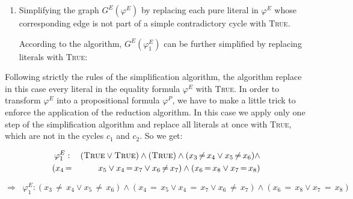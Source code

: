 \documentclass[11pt,a4paper]{uebung}
\begin{document}
{\begin{enumerate}
%

The equality graph has two contradictory cycles, $%
c_{1}=(x_{6},x_{8},x_{7},x_{6})$ and $%
c_{2}=(x_{4},x_{5},x_{6},x_{8},x_{7},x_{4})$.

\item Simplifying the graph $G^{E}(\varphi ^{E})$ by replacing each pure
literal in $\varphi ^{E}$ whose corresponding edge is not part of a simple
contradictory cycle with \textsc{True}.

According to the algorithm, $G^{E}(\varphi _{1}^{E})$ can be further
simplified by replacing literals with \textsc{True}:
\bigskip
\end{enumerate}

Following strictly the rules of the simplification algorithm, the algorithm
replace in this case every literal in the equality formula $\varphi ^{E}$
with \textsc{True}. In order to transform $\varphi ^{E}$ into a
propositional formula $\varphi ^{P}$, we have to make a little trick to
enforce the application of the reduction algorithm. In this case we apply
only one step of the simplification algorithm and replace all literals at
once with \textsc{True}, which are not in the cycles $c_{1}$ and $c_{2}$. So
we get:

\begin{eqnarray*}
\varphi _{1}^{E} &:&(\text{\textsc{True}}\vee \text{\textsc{True}})\wedge (%
\text{\textsc{True}})\wedge (x_{3}\,{\neq }\,x_{4}\vee x_{5}\,{\neq }%
\,x_{6})\wedge \\
(x_{4}\, &{=}&\,x_{5}\vee x_{4}\,{=}\,x_{7}\vee x_{6}\,{\neq }\,x_{7})\wedge
(x_{6}\,{=}\,x_{8}\vee x_{7}\,{=}\,x_{8})
\end{eqnarray*}

\begin{equation*}
\Rightarrow \;\;\varphi _{1}^{E}:(x_{3}\,{\neq }\,x_{4}\vee x_{5}\,{\neq }%
\,x_{6})\wedge (x_{4}\,{=}\,x_{5}\vee x_{4}\,{=}\,x_{7}\vee x_{6}\,{\neq }%
\,x_{7})\wedge (x_{6}\,{=}\,x_{8}\vee x_{7}\,{=}\,x_{8})
\end{equation*}

}
\end{document}
